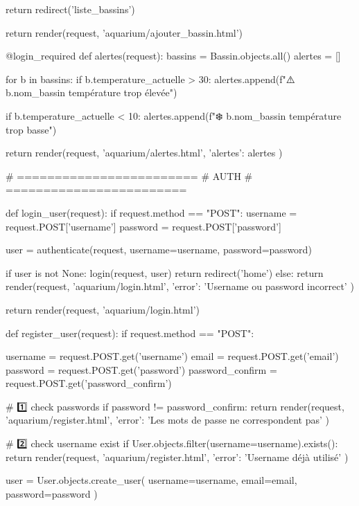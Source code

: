         return redirect('liste_bassins')

    return render(request, 'aquarium/ajouter_bassin.html')


@login_required
def alertes(request):
    bassins = Bassin.objects.all()
    alertes = []

    for b in bassins:
        if b.temperature_actuelle > 30:
            alertes.append(f"⚠️ {b.nom_bassin} température trop élevée")

        if b.temperature_actuelle < 10:
            alertes.append(f"❄️ {b.nom_bassin} température trop basse")

    return render(request, 'aquarium/alertes.html', {
        'alertes': alertes
    })


# ========================
# AUTH
# ========================

def login_user(request):
    if request.method == "POST":
        username = request.POST['username']
        password = request.POST['password']

        user = authenticate(request, username=username, password=password)

        if user is not None:
            login(request, user)
            return redirect('home')
        else:
            return render(request, 'aquarium/login.html', {
                'error': 'Username ou password incorrect'
            })

    return render(request, 'aquarium/login.html')


def register_user(request):
    if request.method == "POST":

        username = request.POST.get('username')
        email = request.POST.get('email')
        password = request.POST.get('password')
        password_confirm = request.POST.get('password_confirm')

        # 1️⃣ check passwords
        if password != password_confirm:
            return render(request, 'aquarium/register.html', {
                'error': 'Les mots de passe ne correspondent pas'
            })

        # 2️⃣ check username exist
        if User.objects.filter(username=username).exists():
            return render(request, 'aquarium/register.html', {
                'error': 'Username déjà utilisé'
            })

      
        user = User.objects.create_user(
            username=username,
            email=email,
            password=password
        )

